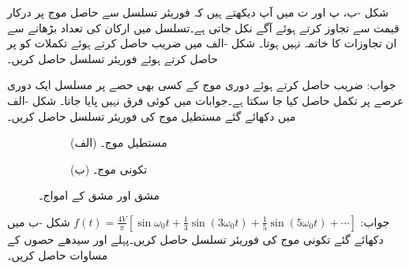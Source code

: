 شکل -ب، پ اور ت میں آپ دیکھتے ہیں کہ فوریئر تسلسل سے حاصل موج  پر درکار قیمت سے تجاوز کرتے ہوئے آگے نکل جاتی ہے۔تسلسل میں ارکان کی تعداد بڑھانے سے ان تجاوزات کا خاتمہ نہیں ہوتا۔
شکل -الف میں  ضریب  حاصل کرتے ہوئے تکملات کو  پر حاصل کرتے ہوئے فوریئر تسلسل حاصل کریں۔

جواب: ضریب  حاصل کرتے ہوئے دوری موج کے کسی بھی حصے پر مسلسل ایک دوری عرصے پر تکمل حاصل کیا جا سکتا ہے۔جوابات میں کوئی فرق نہیں پایا جاتا۔
شکل -الف میں دکھائے گئے مستطیل موج کی فوریئر تسلسل حاصل کریں۔
\begin{figure}
\centering
\begin{subfigure}{0.5\textwidth}
\centering
{}
\caption*{(الف) مستطیل موج۔}
\end{subfigure}%
\begin{subfigure}{0.5\textwidth}
\centering
{}
\caption*{(ب) تکونی موج۔}
\end{subfigure}
\caption{مشق  اور مشق  کے امواج۔}
\label{شکل_فوریئر_مشق_مستطیل}
\end{figure}

جواب:
$f(t)=\frac{4V}{\pi}\left[\sin \omega_0 t+\frac{1}{3}\sin(3\omega_0 t)+\frac{1}{5}\sin(5\omega_0 t)+\cdots\right]$
شکل -ب میں دکھائے گئے تکونی موج کی فوریئر تسلسل حاصل کریں۔پہلے  اور 
 سیدھے حصوں کے مساوات حاصل کریں۔

